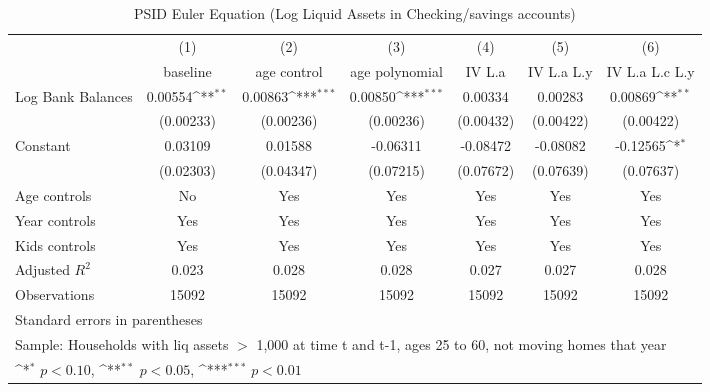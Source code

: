 {
\def\sym#1{\ifmmode^{#1}\else\(^{#1}\)\fi}
\begin{longtable}{l*{6}{c}}
\caption{PSID Euler Equation (Log Liquid Assets in Checking/savings accounts)}\\
\toprule\endfirsthead\midrule\endhead\midrule\endfoot\endlastfoot
                    &\multicolumn{1}{c}{(1)}&\multicolumn{1}{c}{(2)}&\multicolumn{1}{c}{(3)}&\multicolumn{1}{c}{(4)}&\multicolumn{1}{c}{(5)}&\multicolumn{1}{c}{(6)}\\
                    &\multicolumn{1}{c}{baseline}&\multicolumn{1}{c}{age control}&\multicolumn{1}{c}{age polynomial}&\multicolumn{1}{c}{IV L.a}&\multicolumn{1}{c}{IV L.a L.y}&\multicolumn{1}{c}{IV L.a L.c L.y}\\
\midrule
Log Bank Balances   &     0.00554\sym{**} &     0.00863\sym{***}&     0.00850\sym{***}&     0.00334         &     0.00283         &     0.00869\sym{**} \\
                    &   (0.00233)         &   (0.00236)         &   (0.00236)         &   (0.00432)         &   (0.00422)         &   (0.00422)         \\
\addlinespace
Constant            &     0.03109         &     0.01588         &    -0.06311         &    -0.08472         &    -0.08082         &    -0.12565\sym{*}  \\
                    &   (0.02303)         &   (0.04347)         &   (0.07215)         &   (0.07672)         &   (0.07639)         &   (0.07637)         \\
\addlinespace
Age controls        &          No         &         Yes         &         Yes         &         Yes         &         Yes         &         Yes         \\
\addlinespace
Year controls       &         Yes         &         Yes         &         Yes         &         Yes         &         Yes         &         Yes         \\
\addlinespace
Kids controls       &         Yes         &         Yes         &         Yes         &         Yes         &         Yes         &         Yes         \\
\midrule
Adjusted \(R^{2}\)  &       0.023         &       0.028         &       0.028         &       0.027         &       0.027         &       0.028         \\
Observations        &       15092         &       15092         &       15092         &       15092         &       15092         &       15092         \\
\bottomrule
\multicolumn{7}{l}{\footnotesize Standard errors in parentheses}\\
\multicolumn{7}{l}{\footnotesize Sample: Households with liq assets $>$ 1,000 at time t and t-1, ages 25 to 60, not moving homes that year}\\
\multicolumn{7}{l}{\footnotesize \sym{*} \(p<0.10\), \sym{**} \(p<0.05\), \sym{***} \(p<0.01\)}\\
\end{longtable}
}
